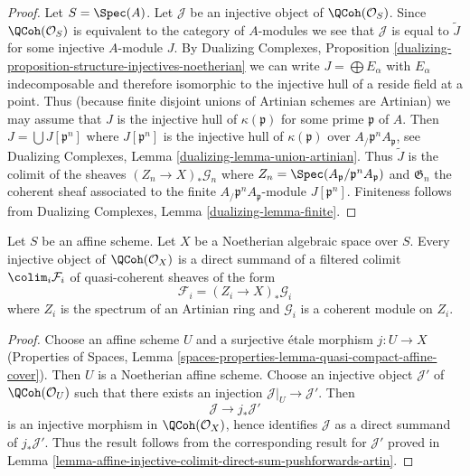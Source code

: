 \begin{proof}
Let $S = \Spec(A)$. Let $\mathcal{J}$ be an injective object of
$\QCoh(\mathcal{O}_S)$. Since $\QCoh(\mathcal{O}_S)$ is
equivalent to the category of $A$-modules we see that $\mathcal{J}$
is equal to $\widetilde{J}$ for some injective $A$-module $J$.
By Dualizing Complexes, Proposition
\ref{dualizing-proposition-structure-injectives-noetherian}
we can write $J = \bigoplus E_\alpha$ with $E_\alpha$ indecomposable
and therefore isomorphic to the injective hull of a reside field
at a point. Thus (because finite disjoint unions of Artinian schemes
are Artinian) we may assume that $J$ is the injective hull
of $\kappa(\mathfrak p)$ for some prime $\mathfrak p$ of $A$.
Then $J = \bigcup J[\mathfrak p^n]$ where $J[\mathfrak p^n]$ is
the injective hull of $\kappa(\mathfrak p)$ over
$A_\mathfrak/\mathfrak p^nA_\mathfrak p$, see
Dualizing Complexes, Lemma \ref{dualizing-lemma-union-artinian}.
Thus $\widetilde{J}$ is the colimit of the sheaves
$(Z_n \to X)_*\mathcal{G}_n$ where
$Z_n = \Spec(A_\mathfrak p/\mathfrak p^nA_\mathfrak p)$ and
$\mathfrak G_n$ the coherent sheaf associated to the
finite $A_\mathfrak/\mathfrak p^nA_\mathfrak p$-module $J[\mathfrak p^n]$.
Finiteness follows from
Dualizing Complexes, Lemma \ref{dualizing-lemma-finite}.
\end{proof}

\begin{lemma}
\label{lemma-injective-colimit-direct-sum-pushforwards-artin}
Let $S$ be an affine scheme. Let $X$ be a Noetherian algebraic space
over $S$. Every injective object of $\QCoh(\mathcal{O}_X)$ is
a direct summand of a filtered colimit $\colim_i \mathcal{F}_i$
of quasi-coherent sheaves of the form
$$
\mathcal{F}_i = (Z_i \to X)_*\mathcal{G}_i
$$
where $Z_i$ is the spectrum of an Artinian ring and $\mathcal{G}_i$
is a coherent module on $Z_i$.
\end{lemma}

\begin{proof}
Choose an affine scheme $U$ and a surjective \'etale morphism
$j : U \to X$ (Properties of Spaces, Lemma
\ref{spaces-properties-lemma-quasi-compact-affine-cover}).
Then $U$ is a Noetherian affine scheme. Choose an injective object
$\mathcal{J}'$ of $\QCoh(\mathcal{O}_U)$ such that there
exists an injection $\mathcal{J}|_U \to \mathcal{J}'$. Then
$$
\mathcal{J} \to j_*\mathcal{J}'
$$
is an injective morphism in $\QCoh(\mathcal{O}_X)$,
hence identifies $\mathcal{J}$ as a direct summand of $j_*\mathcal{J}'$.
Thus the result follows from the corresponding result for
$\mathcal{J}'$ proved in
Lemma \ref{lemma-affine-injective-colimit-direct-sum-pushforwards-artin}.
\end{proof}

